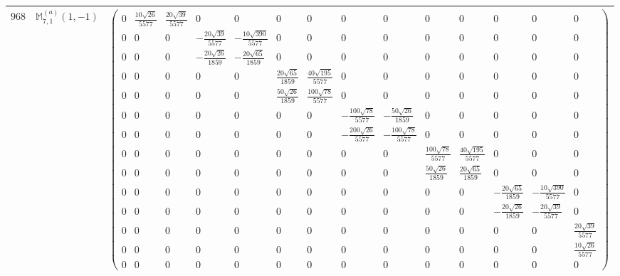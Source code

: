 \documentclass[fleqn,8pt,landscape]{jsarticle}
\begin{document}
\begin{center}
\begin{longtable}{ccc}
$ 968 $ & $ \mathbb{M}_{7,1}^{(a)}(1,-1) $ & $ \begin{pmatrix} 0 & \frac{10 \sqrt{26}}{5577} & \frac{20 \sqrt{39}}{5577} & 0 & 0 & 0 & 0 & 0 & 0 & 0 & 0 & 0 & 0 & 0 \\ 0 & 0 & 0 & - \frac{20 \sqrt{39}}{5577} & - \frac{10 \sqrt{390}}{5577} & 0 & 0 & 0 & 0 & 0 & 0 & 0 & 0 & 0 \\ 0 & 0 & 0 & - \frac{20 \sqrt{26}}{1859} & - \frac{20 \sqrt{65}}{1859} & 0 & 0 & 0 & 0 & 0 & 0 & 0 & 0 & 0 \\ 0 & 0 & 0 & 0 & 0 & \frac{20 \sqrt{65}}{1859} & \frac{40 \sqrt{195}}{5577} & 0 & 0 & 0 & 0 & 0 & 0 & 0 \\ 0 & 0 & 0 & 0 & 0 & \frac{50 \sqrt{26}}{1859} & \frac{100 \sqrt{78}}{5577} & 0 & 0 & 0 & 0 & 0 & 0 & 0 \\ 0 & 0 & 0 & 0 & 0 & 0 & 0 & - \frac{100 \sqrt{78}}{5577} & - \frac{50 \sqrt{26}}{1859} & 0 & 0 & 0 & 0 & 0 \\ 0 & 0 & 0 & 0 & 0 & 0 & 0 & - \frac{200 \sqrt{26}}{5577} & - \frac{100 \sqrt{78}}{5577} & 0 & 0 & 0 & 0 & 0 \\ 0 & 0 & 0 & 0 & 0 & 0 & 0 & 0 & 0 & \frac{100 \sqrt{78}}{5577} & \frac{40 \sqrt{195}}{5577} & 0 & 0 & 0 \\ 0 & 0 & 0 & 0 & 0 & 0 & 0 & 0 & 0 & \frac{50 \sqrt{26}}{1859} & \frac{20 \sqrt{65}}{1859} & 0 & 0 & 0 \\ 0 & 0 & 0 & 0 & 0 & 0 & 0 & 0 & 0 & 0 & 0 & - \frac{20 \sqrt{65}}{1859} & - \frac{10 \sqrt{390}}{5577} & 0 \\ 0 & 0 & 0 & 0 & 0 & 0 & 0 & 0 & 0 & 0 & 0 & - \frac{20 \sqrt{26}}{1859} & - \frac{20 \sqrt{39}}{5577} & 0 \\ 0 & 0 & 0 & 0 & 0 & 0 & 0 & 0 & 0 & 0 & 0 & 0 & 0 & \frac{20 \sqrt{39}}{5577} \\ 0 & 0 & 0 & 0 & 0 & 0 & 0 & 0 & 0 & 0 & 0 & 0 & 0 & \frac{10 \sqrt{26}}{5577} \\ 0 & 0 & 0 & 0 & 0 & 0 & 0 & 0 & 0 & 0 & 0 & 0 & 0 & 0 \end{pmatrix} $ \\ \hline

\end{longtable}
\end{center}
\end{document}
